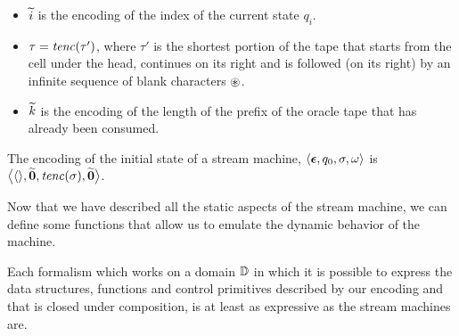 \begin{conditional}{\appendixorsup}
\begin{defn}
\begin{itemize}
  \item ${\widetilde{i}}$ is the encoding of the index of the
  current state $q_i$.

  \item ${\tau} = \mathit{tenc}(\tau')$,
  where $\tau'$ is the shortest portion of the tape
  that starts from the cell under the head,
  continues on its right and is followed
  (on its right) by an infinite sequence of blank characters
  $\circledast$.

  \item {$\widetilde{k}$} is the encoding of the length
  of the prefix of the oracle tape
  that has already been consumed.
  \end{itemize}
  \end{defn}


  \begin{remark}
  The encoding of the initial state
  of a stream machine, $\langle \bm{\epsilon},
  q_0,\sigma, \omega\rangle$
  is {$\big\langle \langle \rangle,
  \widetilde{\mathbf{0}}, \mathit{tenc}(\sigma),
  \widetilde{\mathbf{0}} \big\rangle$}.
  \end{remark}




  Now that we have described all the
  static aspects of the stream machine,
  we can define some functions that
  allow us to emulate
  the dynamic behavior of the machine.

\end{conditional}


\begin{lemma}\label{lemma:SFPimpl}
Each formalism which works on a domain
$\mathbb{D}$ in which it is possible to express
the data structures, functions and control
primitives described by our encoding
and that is closed under
composition, is at least as expressive as
the stream machines are.
\end{lemma}

